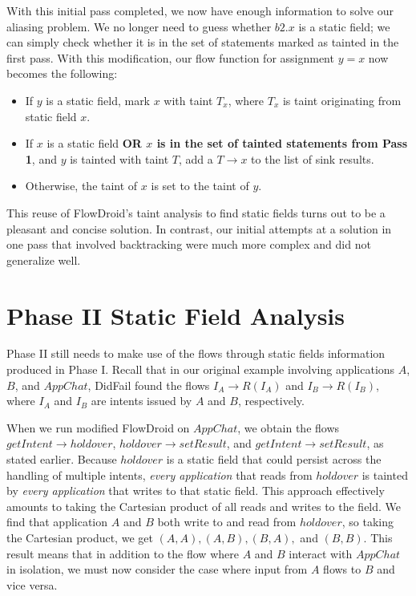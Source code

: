 With this initial pass completed, we now have enough information to solve our aliasing problem. We no longer need to guess whether $\mathit{b2}.x$ is a static field; we can simply check whether it is in the set of statements marked as tainted in the first pass. With this modification, our flow function for assignment $y = x$ now becomes the following:

\begin{itemize}
\item If $y$ is a static field, mark $x$ with taint $T_x$, where $T_x$ is taint originating from static field $x$.
\item If $x$ is a static field \textbf{OR $x$ is in the set of tainted statements from Pass 1}, and $y$ is tainted with taint $T$, add a $T\rightarrow x$ to the list of sink results.
\item Otherwise, the taint of $x$ is set to the taint of $y$.
\end{itemize}

This reuse of FlowDroid's taint analysis to find static fields turns out to be a pleasant and concise solution. In contrast, our initial attempts at a solution in one pass that involved backtracking were much more complex and did not generalize well.

\section{Phase II Static Field Analysis}
\label{sec:staticphase2}

Phase II still needs to make use of the flows through static fields information produced in Phase I. Recall that in our original example involving applications $A$, $B$, and $AppChat$, DidFail found the flows $I_A\rightarrow R(I_A)$ and $I_B\rightarrow R(I_B)$, where $I_A$ and $I_B$ are intents issued by $A$ and $B$, respectively. 

When we run modified FlowDroid on $AppChat$, we obtain the flows $getIntent\rightarrow holdover$, $holdover\rightarrow setResult$, and $getIntent\rightarrow setResult$, as stated earlier. Because $holdover$ is a static field that could persist across the handling of multiple intents, \emph{every application} that reads from $holdover$ is tainted by \emph{every application} that writes to that static field. This approach effectively amounts to taking the Cartesian product of all reads and writes to the field. We find that application $A$ and $B$ both write to and read from $holdover$, so taking the Cartesian product, we get $(A, A), (A, B), (B, A),$ and $(B, B)$. This result means that in addition to the flow where $A$ and $B$ interact with $AppChat$ in isolation, we must now consider the case where input from $A$ flows to $B$ and vice versa.

